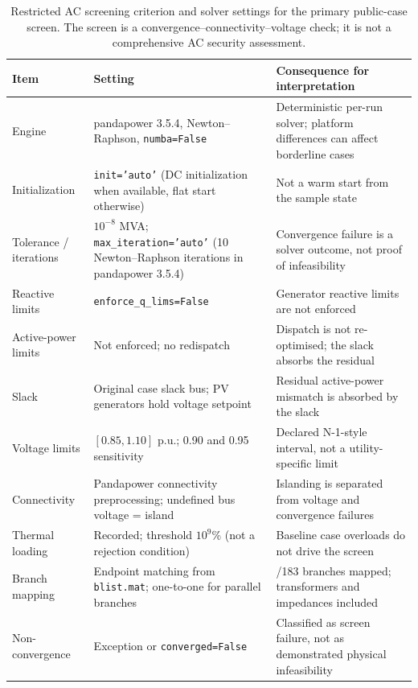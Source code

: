 \begin{table}[!htbp]
\centering
\caption{Restricted AC screening criterion and solver settings for the primary public-case screen. The screen is a convergence--connectivity--voltage check; it is not a comprehensive AC security assessment.}
\label{tab:solver}
\begingroup{}
\scriptsize
\setlength{\tabcolsep}{3pt}
\begin{tabularx}{\textwidth}{@{}l>{\raggedright\arraybackslash\hsize=1.1\hsize}X>{\raggedright\arraybackslash\hsize=0.9\hsize}X@{}}
\toprule
Item & Setting & Consequence for interpretation \\
\midrule
Engine & pandapower 3.5.4, Newton--Raphson, \texttt{numba=False} & Deterministic per-run solver; platform differences can affect borderline cases \\
Initialization & \texttt{init='auto'} (DC initialization when available, flat start otherwise) & Not a warm start from the sample state \\
Tolerance / iterations & $10^{-8}$ MVA; \texttt{max\_iteration='auto'} (10 Newton--Raphson iterations in pandapower 3.5.4) & Convergence failure is a solver outcome, not proof of infeasibility \\
Reactive limits & \texttt{enforce\_q\_lims=False} & Generator reactive limits are not enforced \\
Active-power limits & Not enforced; no redispatch & Dispatch is not re-optimised; the slack absorbs the residual \\
Slack & Original case slack bus; PV generators hold voltage setpoint & Residual active-power mismatch is absorbed by the slack \\
Voltage limits & $[0.85,1.10]$ p.u.; 0.90 and 0.95 sensitivity & Declared N-1-style interval, not a utility-specific limit \\
Connectivity & Pandapower connectivity preprocessing; undefined bus voltage = island & Islanding is separated from voltage and convergence failures \\
Thermal loading & Recorded; threshold $10^{9}$\% (not a rejection condition) & Baseline case overloads do not drive the screen \\
Branch mapping & Endpoint matching from \texttt{blist.mat}; one-to-one for parallel branches & 183/183 branches mapped; transformers and impedances included \\
Non-convergence & Exception or \texttt{converged=False} & Classified as screen failure, not as demonstrated physical infeasibility \\
\bottomrule
\end{tabularx}
\endgroup
\end{table}

